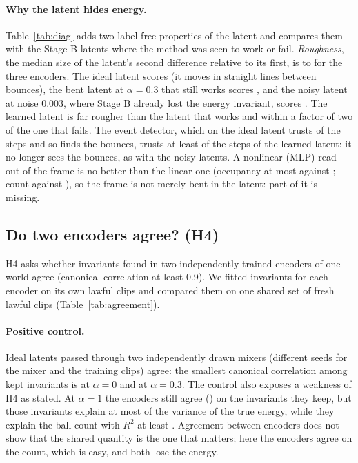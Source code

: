 \documentclass[11pt]{article}
\begin{document}
\paragraph{Why the latent hides energy.} Table~\ref{tab:diag} adds two label-free properties of the
latent and compares them with the Stage B latents where the method was seen to work or fail.
\emph{Roughness}, the median size of the latent's second difference relative to its first, is
\DRoughMin{} to \DRoughMax{} for the three encoders. The ideal latent scores \DRefIdealRough{} (it
moves in straight lines between bounces), the bent latent at $\alpha = 0.3$ that still works scores
\DRefAZeroThreeNZeroRough{}, and the noisy latent at noise 0.003, where Stage B already lost the
energy invariant, scores \DRefAZeroNZeroZeroZeroThreeRough{}. The learned latent is far
rougher than the latent that works and within a factor of two of the one that fails.
The event detector, which on the ideal latent trusts \DRefIdealClean{} of the steps and so finds the
bounces, trusts at least \DCleanMin{} of the steps of the learned latent: it no longer sees the
bounces, as with the noisy latents. A nonlinear (MLP) read-out of the frame is no better than the
linear one (occupancy at most \DMlpOccMax{} against \DLinOccMax{}; count \DMlpCountMax{} against
\DLinCountMax{}), so the frame is not merely bent in the latent: part of it is missing.



\FloatBarrier
\subsection{Do two encoders agree? (H4)}\label{sec:h4}

H4 asks whether invariants found in two independently trained encoders of one world agree
(canonical correlation at least 0.9). We fitted invariants for each encoder on its own lawful clips
and compared them on one shared set of fresh lawful clips (Table~\ref{tab:agreement}).

\paragraph{Positive control.} Ideal latents passed through two independently drawn mixers (different
seeds for the mixer and the training clips) agree: the smallest canonical correlation among kept
invariants is \HCtlAZeroCcmin{} at $\alpha = 0$ and \HCtlAZeroThreeCcmin{} at $\alpha = 0.3$. The
control also exposes a weakness of H4 as stated. At $\alpha = 1$ the encoders still agree
(\HCtlAOneCcmin{}) on the \HCtlAOneKmax{} invariants they keep, but those invariants explain at most
\HCtlAOneRtwomax{} of the variance of the true energy, while they explain the ball count with $R^2$ at
least \HCtlAOneRtwocountmin{}. Agreement between encoders does not show that the shared quantity is
the one that matters; here the encoders agree on the count, which is easy, and both lose the energy.
\end{document}
